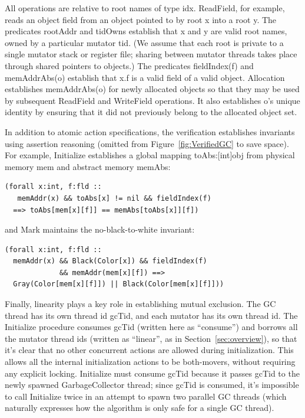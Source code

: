 All operations are relative to root names of type idx.
ReadField, for example, reads an object field from an object pointed to by root x into a root y.
The predicates rootAddr and tidOwns establish that x and y are valid root names, owned by a particular mutator tid.
(We assume that each root is private to a single mutator stack or register file;
sharing between mutator threads takes place through shared pointers to objects.)
The predicates fieldIndex(f) and memAddrAbs(o) establish that x.f is a valid field of a valid object.
Allocation establishes memAddrAbs(o) for newly allocated objects so that they may be used by subsequent ReadField and WriteField operations.
It also establishes o's unique identity by ensuring that it did not previously belong to the allocated object set.

In addition to atomic action specifications, the verification establishes invariants using assertion reasoning
(omitted from Figure~\ref{fig:VerifiedGC} to save space).
For example, Initialize establishes a global mapping toAbs:[int]obj from physical memory mem and abstract memory memAbs:

\begin{verbatim}
(forall x:int, f:fld ::
   memAddr(x) && toAbs[x] != nil && fieldIndex(f)
  ==> toAbs[mem[x][f]] == memAbs[toAbs[x]][f])
\end{verbatim}

and Mark maintains the no-black-to-white invariant:

\begin{verbatim}
(forall x:int, f:fld ::
  memAddr(x) && Black(Color[x]) && fieldIndex(f)
             && memAddr(mem[x][f]) ==>
  Gray(Color[mem[x][f]]) || Black(Color[mem[x][f]]))
\end{verbatim}

Finally, linearity plays a key role in establishing mutual exclusion.
The GC thread has its own thread id gcTid, and each mutator has its own thread id.
The Initialize procedure consumes gcTid (written here as ``consume'')
and borrows all the mutator thread ids (written as ``linear'', as in Section~\ref{sec:overview}),
so that it's clear that no other concurrent actions are allowed during initialization.
This allows all the internal initialization actions to be both-movers, without requiring any explicit locking.
Initialize must consume gcTid because it passes gcTid to the newly spawned GarbageCollector thread;
since gcTid is consumed, it's impossible to call Initialize twice in an attempt to spawn two parallel GC threads
(which naturally expresses how the algorithm is only safe for a single GC thread).

